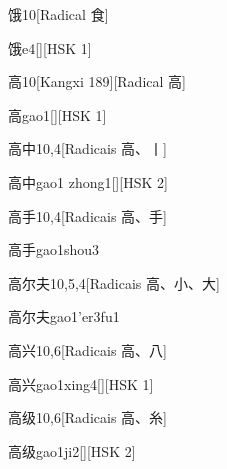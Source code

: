 \begin{entry}{饿}{10}[Radical ⾷]
  \begin{phonetics}{饿}{e4}[][HSK 1]
  \end{phonetics}
\end{entry}

\begin{entry}{高}{10}[Kangxi 189][Radical ⾼]
  \begin{phonetics}{高}{gao1}[][HSK 1]
  \end{phonetics}
\end{entry}

\begin{entry}{高中}{10,4}[Radicais ⾼、⼁]
  \begin{phonetics}{高中}{gao1 zhong1}[][HSK 2]
  \end{phonetics}
\end{entry}

\begin{entry}{高手}{10,4}[Radicais ⾼、⼿]
  \begin{phonetics}{高手}{gao1shou3}
  \end{phonetics}
\end{entry}

\begin{entry}{高尔夫}{10,5,4}[Radicais ⾼、⼩、⼤]
  \begin{phonetics}{高尔夫}{gao1'er3fu1}
  \end{phonetics}
\end{entry}

\begin{entry}{高兴}{10,6}[Radicais ⾼、⼋]
  \begin{phonetics}{高兴}{gao1xing4}[][HSK 1]
  \end{phonetics}
\end{entry}

\begin{entry}{高级}{10,6}[Radicais ⾼、⽷]
  \begin{phonetics}{高级}{gao1ji2}[][HSK 2]
  \end{phonetics}
\end{entry}

